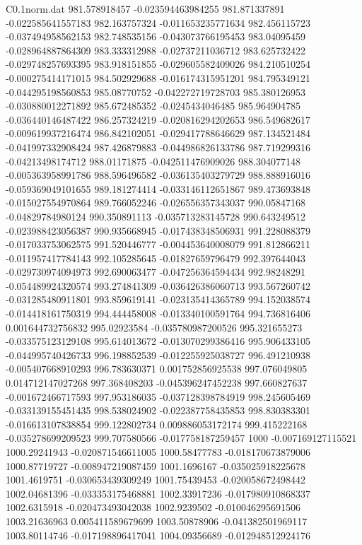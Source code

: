 \begin{filecontents}{C0.1norm.dat}
981.578918457		-0.023594463984255
981.871337891		-0.022585641557183
982.163757324		-0.011653235771634
982.456115723		-0.037494958562153
982.748535156		-0.043073766195453
983.04095459		-0.028964887864309
983.333312988		-0.02737211036712
983.625732422		-0.029748257693395
983.918151855		-0.029605582409026
984.210510254		-0.000275414171015
984.502929688		-0.016174315951201
984.795349121		-0.044295198560853
985.08770752		-0.042272719728703
985.380126953		-0.030880012271892
985.672485352		-0.0245434046485
985.964904785		-0.036440146487422
986.257324219		-0.020816294202653
986.549682617		-0.009619937216474
986.842102051		-0.029417788646629
987.134521484		-0.041997332908424
987.426879883		-0.044986826133786
987.719299316		-0.04213498174712
988.01171875		-0.042511476909026
988.304077148		-0.005363958991786
988.596496582		-0.036135403279729
988.888916016		-0.059369049101655
989.181274414		-0.033146112651867
989.473693848		-0.015027554970864
989.766052246		-0.026556357343037
990.05847168		-0.04829784980124
990.350891113		-0.035713283145728
990.643249512		-0.023988423056387
990.935668945		-0.017438348506931
991.228088379		-0.017033753062575
991.520446777		-0.004453640008079
991.812866211		-0.011957417784143
992.105285645		-0.01827659796479
992.397644043		-0.029730974094973
992.690063477		-0.047256364594434
992.98248291		-0.054489924320574
993.274841309		-0.036426386060713
993.567260742		-0.031285480911801
993.859619141		-0.023135414365789
994.152038574		-0.014418161750319
994.444458008		-0.013340100591764
994.736816406		0.001644732756832
995.02923584		-0.035780987200526
995.321655273		-0.033575123129108
995.614013672		-0.013070299386416
995.906433105		-0.044995740426733
996.198852539		-0.012255925038727
996.491210938		-0.005407668910293
996.783630371		0.001752856925538
997.076049805		0.014712147027268
997.368408203		-0.045396247452238
997.660827637		-0.001672466717593
997.953186035		-0.037128398784919
998.245605469		-0.033139155451435
998.538024902		-0.022387758435853
998.830383301		-0.016613107838854
999.122802734		0.009886053172174
999.415222168		-0.035278699209523
999.707580566		-0.017758187259457
1000		-0.007169127115521
1000.29241943		-0.020871546611005
1000.58477783		-0.018170673879006
1000.87719727		-0.008947219087459
1001.1696167		-0.035025918225678
1001.4619751		-0.030653439309249
1001.75439453		-0.020058672498442
1002.04681396		-0.033353175468881
1002.33917236		-0.017980910868337
1002.6315918		-0.020473493042038
1002.9239502		-0.010046295691506
1003.21636963		0.005411589679699
1003.50878906		-0.041382501969117
1003.80114746		-0.017198896417041
1004.09356689		-0.012948512924176

\end{filecontents}
